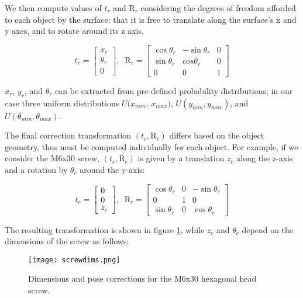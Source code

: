We then compute values of $t_r$ and $\text{R}_r$ considering the degrees of freedom afforded to each object by the surface: that it is free to translate along the surface's x and y axes, and to rotate around its z axis.

\begin{equation*}
    t_r = 
    \begin{bmatrix}
        x_r\\y_r\\0
    \end{bmatrix}
    ,\; \; \text{R}_r =
    \begin{bmatrix}
        \cos \theta_r & - \sin \theta_r & 0 \\
        \sin \theta_r & cos \theta_r & 0 \\
        0 & 0 & 1
    \end{bmatrix}
\end{equation*}

$x_r$, $y_r$, and  $\theta_r$ can be extracted from pre-defined probability distributions; in our case three uniform distributions $U(x_{min}$, $x_{max})$, $U(y_{min}, y_{max})$, and $U(\theta_{min}, \theta_{max})$.

The final correction transformation $(t_c, \text{R}_c)$ differs based on the object geometry, thus must be computed individually for each object. For example, if we consider the M6x30 screw, $(t_c, \text{R}_c)$ is given by a translation $z_c$ along the z-axis and a rotation by $\theta_c$ around the y-axis:

\begin{equation*}
    t_c = 
    \begin{bmatrix}
        0\\0\\z_c
    \end{bmatrix}
    ,\; \; \text{R}_c =
    \begin{bmatrix}
        \cos \theta_c & 0 & -\sin \theta_c\\
        0 & 1 & 0\\
        \sin \theta_c & 0 &  \cos \theta_c
    \end{bmatrix}
\end{equation*}

The resulting transformation is shown in figure \ref*{fig:screwdim}, while $z_c$ and $\theta_c$ depend on the dimensions of the screw as follows:

\begin{figure}[ht]
    \texttt{[image: screwdims.png]}
    \caption{Dimensions and pose corrections for the M6x30 hexagonal head screw.}
    \label{fig:screwdim}
\end{figure}

